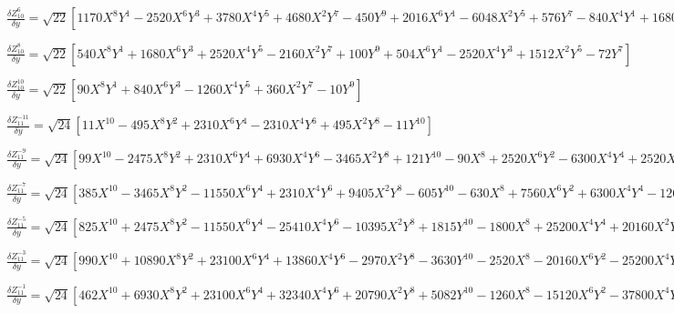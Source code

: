 \documentclass[10pt,landscape]{article}
\begin{document}
\vspace{1.2 mm}
\noindent $ \frac{\delta Z^{6}_{10}}{\delta y} = \sqrt{22} [1170X^{8}Y^{1} -2520X^{6}Y^{3} +3780X^{4}Y^{5} +4680X^{2}Y^{7} -450Y^{9} +2016X^{6}Y^{1} -6048X^{2}Y^{5} +576Y^{7} -840X^{4}Y^{1} +1680X^{2}Y^{3} -168Y^{5}] $

\vspace{1.2 mm}
\noindent $ \frac{\delta Z^{8}_{10}}{\delta y} = \sqrt{22} [540X^{8}Y^{1} +1680X^{6}Y^{3} +2520X^{4}Y^{5} -2160X^{2}Y^{7} +100Y^{9} +504X^{6}Y^{1} -2520X^{4}Y^{3} +1512X^{2}Y^{5} -72Y^{7}] $

\vspace{1.2 mm}
\noindent $ \frac{\delta Z^{10}_{10}}{\delta y} = \sqrt{22} [90X^{8}Y^{1} +840X^{6}Y^{3} -1260X^{4}Y^{5} +360X^{2}Y^{7} -10Y^{9}] $

\vspace{1.2 mm}
\noindent $ \frac{\delta Z^{-11}_{11}}{\delta y} = \sqrt{24} [11X^{10} -495X^{8}Y^{2} +2310X^{6}Y^{4} -2310X^{4}Y^{6} +495X^{2}Y^{8} -11Y^{10}] $

\vspace{1.2 mm}
\noindent $ \frac{\delta Z^{-9}_{11}}{\delta y} = \sqrt{24} [99X^{10} -2475X^{8}Y^{2} +2310X^{6}Y^{4} +6930X^{4}Y^{6} -3465X^{2}Y^{8} +121Y^{10} -90X^{8} +2520X^{6}Y^{2} -6300X^{4}Y^{4} +2520X^{2}Y^{6} -90Y^{8}] $

\vspace{1.2 mm}
\noindent $ \frac{\delta Z^{-7}_{11}}{\delta y} = \sqrt{24} [385X^{10} -3465X^{8}Y^{2} -11550X^{6}Y^{4} +2310X^{4}Y^{6} +9405X^{2}Y^{8} -605Y^{10} -630X^{8} +7560X^{6}Y^{2} +6300X^{4}Y^{4} -12600X^{2}Y^{6} +810Y^{8} +252X^{6} -3780X^{4}Y^{2} +3780X^{2}Y^{4} -252Y^{6}] $

\vspace{1.2 mm}
\noindent $ \frac{\delta Z^{-5}_{11}}{\delta y} = \sqrt{24} [825X^{10} +2475X^{8}Y^{2} -11550X^{6}Y^{4} -25410X^{4}Y^{6} -10395X^{2}Y^{8} +1815Y^{10} -1800X^{8} +25200X^{4}Y^{4} +20160X^{2}Y^{6} -3240Y^{8} +1260X^{6} -3780X^{4}Y^{2} -11340X^{2}Y^{4} +1764Y^{6} -280X^{4} +1680X^{2}Y^{2} -280Y^{4}] $

\vspace{1.2 mm}
\noindent $ \frac{\delta Z^{-3}_{11}}{\delta y} = \sqrt{24} [990X^{10} +10890X^{8}Y^{2} +23100X^{6}Y^{4} +13860X^{4}Y^{6} -2970X^{2}Y^{8} -3630Y^{10} -2520X^{8} -20160X^{6}Y^{2} -25200X^{4}Y^{4} +7560Y^{8} +2268X^{6} +11340X^{4}Y^{2} +3780X^{2}Y^{4} -5292Y^{6} -840X^{4} -1680X^{2}Y^{2} +1400Y^{4} +105X^{2} -105Y^{2}] $

\vspace{1.2 mm}
\noindent $ \frac{\delta Z^{-1}_{11}}{\delta y} = \sqrt{24} [462X^{10} +6930X^{8}Y^{2} +23100X^{6}Y^{4} +32340X^{4}Y^{6} +20790X^{2}Y^{8} +5082Y^{10} -1260X^{8} -15120X^{6}Y^{2} -37800X^{4}Y^{4} -35280X^{2}Y^{6} -11340Y^{8} +1260X^{6} +11340X^{4}Y^{2} +18900X^{2}Y^{4} +8820Y^{6} -560X^{4} -3360X^{2}Y^{2} -2800Y^{4} +105X^{2} +315Y^{2} -6] $
\end{document}
